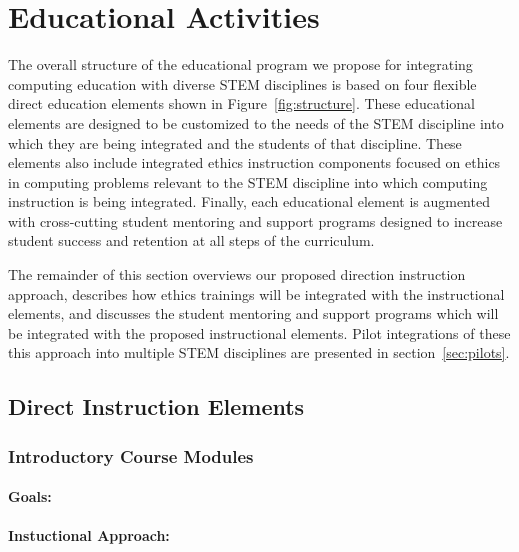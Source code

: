 \section{Educational Activities}
\label{sec:approach}

The overall structure of the educational program we propose for integrating computing education with diverse STEM disciplines is based on four flexible direct education elements shown in Figure~\ref{fig:structure}.  These educational elements are designed to be customized to the needs of the STEM discipline into which they are being integrated and the students of that discipline.  These elements also include integrated ethics instruction components focused on ethics in computing problems relevant to the STEM discipline into which computing instruction is being integrated. Finally, each educational element is augmented with cross-cutting student mentoring and support programs designed to increase student success and retention at all steps of the curriculum. 

The remainder of this section overviews our proposed direction instruction approach, describes how ethics trainings will be integrated with the instructional elements, and discusses the student mentoring and support programs which will be integrated with the proposed instructional elements.  Pilot integrations of these this approach into multiple STEM disciplines are presented in section~\ref{sec:pilots}.

\subsection{Direct Instruction Elements}

\subsubsection{Introductory Course Modules}
\paragraph{Goals:}
\paragraph{Instuctional Approach:}
